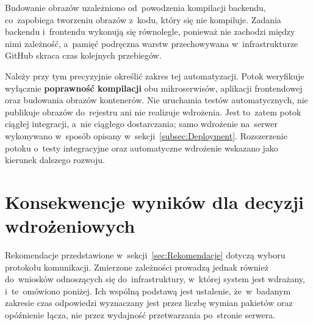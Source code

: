 Budowanie obrazów uzależniono od~powodzenia kompilacji backendu, co~zapobiega tworzeniu obrazów z~kodu, który się nie kompiluje. Zadania backendu i~frontendu wykonują się równolegle, ponieważ nie zachodzi między nimi zależność, a~pamięć podręczna warstw przechowywana w~infrastrukturze GitHub skraca czas kolejnych przebiegów.

Należy przy tym precyzyjnie określić zakres tej automatyzacji. Potok weryfikuje wyłącznie \textbf{poprawność kompilacji} obu mikroserwisów, aplikacji frontendowej oraz budowania obrazów kontenerów. Nie uruchamia testów automatycznych, nie publikuje obrazów do~rejestru ani nie realizuje wdrożenia. Jest to~zatem potok ciągłej integracji, a~nie ciągłego dostarczania; samo wdrożenie na~serwer wykonywano w~sposób opisany w~sekcji~\ref{subsec:Deployment}. Rozszerzenie potoku o~testy integracyjne oraz automatyczne wdrożenie wskazano jako kierunek dalszego rozwoju.

\section{Konsekwencje wyników dla decyzji wdrożeniowych}
\label{sec:WnioskiWdrozeniowe}

Rekomendacje przedstawione w~sekcji~\ref{sec:Rekomendacje} dotyczą wyboru protokołu komunikacji. Zmierzone zależności prowadzą jednak również do~wniosków odnoszących się do~infrastruktury, w~której system jest wdrażany, i~te~omówiono poniżej. Ich wspólną podstawą jest ustalenie, że~w~badanym zakresie czas odpowiedzi wyznaczany jest przez liczbę wymian pakietów oraz opóźnienie łącza, nie przez wydajność przetwarzania po~stronie serwera.

